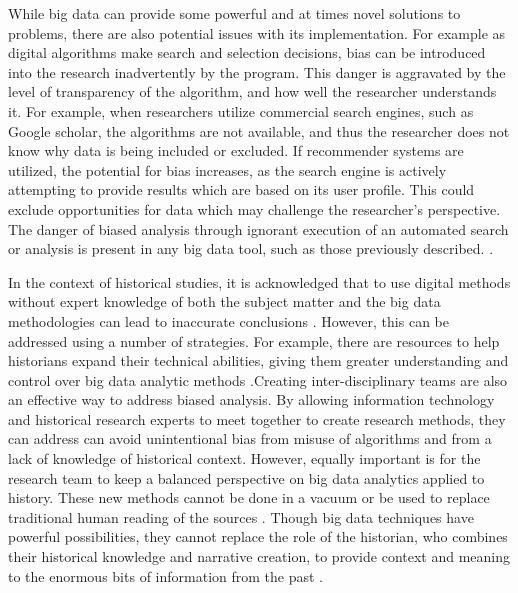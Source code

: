 \documentclass[sigconf]{acmart}
\begin{document}
While big data can provide some powerful and at times novel solutions to problems, there are also potential issues with its implementation. For example as digital algorithms make search and selection decisions, bias can be introduced into the research inadvertently by the program. This danger is aggravated by the level of transparency of the algorithm, and how well the researcher understands it. For example, when researchers utilize commercial search engines, such as Google scholar, the algorithms are not available, and thus the researcher does not know why data is being included or excluded. If recommender systems are utilized, the potential for bias increases, as the search engine is actively attempting to provide results which are based on its user profile. This could exclude opportunities for data which may challenge the researcher's perspective. The danger of biased analysis through ignorant execution of an automated search or analysis is present in any big data tool, such as those previously described. \cite{bigdatacritique}.

In the context of historical studies, it is acknowledged that to use digital methods without expert knowledge of both the subject matter and the big data methodologies can lead to inaccurate conclusions \cite{digitalrepublicletters}. However, this can be addressed using a number of strategies. For example, there are resources to help historians expand their technical abilities, giving them greater understanding and control over big data analytic methods \cite{proghistabout}.Creating inter-disciplinary teams are also an effective way to address biased analysis. By allowing information technology and historical research experts to meet together to create research methods, they can address can avoid unintentional bias from misuse of algorithms and from a lack of knowledge of historical context. However, equally important is for the  research team to keep a balanced perspective on big data analytics applied to history. These new methods cannot be done in a vacuum or be used to replace traditional human reading of the sources \cite{digitalrepublicletters}. Though big data techniques have powerful possibilities, they cannot replace the role of the historian, who combines their historical knowledge and narrative creation, to provide context and meaning to the enormous bits of information from the past \cite{bdglobalhist}.
\end{document}
